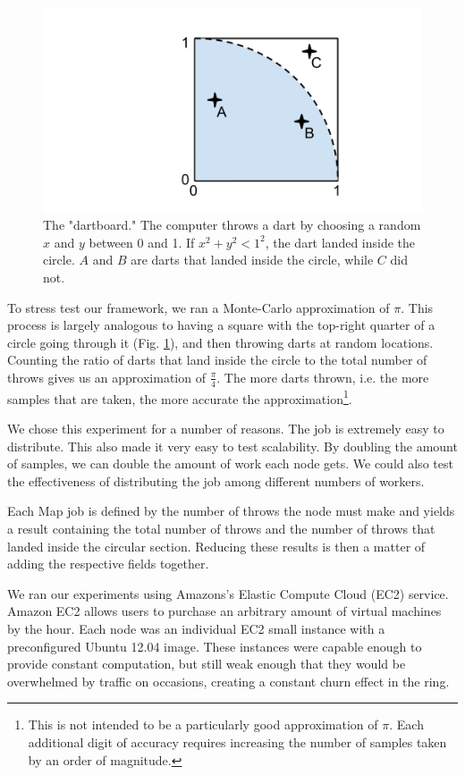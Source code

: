 \begin{figure}
	\includegraphics[width=\linewidth]{figs/dartboard}
	\caption{The "dartboard." The computer throws a dart by choosing a random $x$ and $y$ between 0 and 1.  If $x^{2} + y^{2} < 1^{2} $, the dart landed inside the circle.  $A$ and $B$ are darts that landed inside the circle, while $C$ did not.}
	\label{fig:dartboard}
\end{figure}

To stress test our framework, we ran a Monte-Carlo approximation of $\pi$. This process is largely analogous to having a square with the top-right quarter of a circle going through it (Fig. \ref{fig:dartboard}), and then throwing darts at random locations.  Counting the ratio of darts that land inside the circle to the total number of throws gives us an approximation of $\frac{\pi}{4}$.  The more darts thrown, i.e. the more samples that are taken, the more accurate the approximation\footnote{This is not intended to be a particularly good approximation of $\pi$. Each additional digit of accuracy requires increasing the number of samples taken by an order of magnitude.}.

We chose this experiment for a number of reasons. The job is extremely easy to distribute.  This also made it very easy to test scalability. By doubling the amount of samples, we can double the amount of work each node gets.  We could also test the effectiveness of distributing the job among different numbers of workers.

Each Map job is defined by the number of throws the node must make and yields a result containing the total number of throws and the number of throws that landed inside the circular section.  Reducing these results is then a matter of adding the respective fields together. 

We ran our experiments using Amazons's Elastic Compute Cloud (EC2) service.  Amazon EC2 allows users to purchase an arbitrary amount of virtual machines by the hour. Each node was an individual EC2 small instance \cite{amazon-instances} with a preconfigured Ubuntu 12.04 image.  These instances were capable enough to provide constant computation, but still weak enough that they would be overwhelmed by traffic on occasions, creating a constant churn effect in the ring.  

